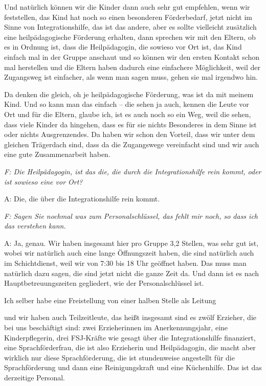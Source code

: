 \begin{linenumbers*}
Und natürlich können wir die Kinder dann auch sehr gut empfehlen, wenn wir feststellen, das Kind hat noch so einen besonderen Förderbedarf, jetzt nicht im Sinne von Integrationshilfe, das ist das andere, aber es sollte vielleicht zusätzlich eine heilpädagogische Förderung erhalten, dann sprechen wir mit den Eltern, ob es in Ordnung ist, dass die Heilpädagogin, die sowieso vor Ort ist, das Kind einfach mal in der Gruppe anschaut und so können wir den ersten Kontakt schon mal herstellen und die Eltern haben dadurch eine einfachere Möglichkeit, weil der Zugangsweg ist einfacher, als wenn man sagen muss, gehen sie mal irgendwo hin. 

Da denken die gleich, oh je heilpädagogische Förderung, was ist da mit meinem Kind. Und so kann man das einfach -- die sehen ja auch, kennen die Leute vor Ort und für die Eltern, glaube ich, ist es auch noch so ein Weg, weil die sehen, dass viele Kinder da hingehen, dass es für sie nichts Besonderes in dem Sinne ist oder nichts Ausgrenzendes. Da haben wir schon den Vorteil, dass wir unter dem gleichen Trägerdach sind, dass da die Zugangswege vereinfacht sind und wir auch eine gute Zusammenarbeit haben.

\emph{F: Die Heilpädagogin, ist das die, die durch die Integrationshilfe rein kommt, oder ist sowieso eine vor Ort?}

A: Die, die über die Integrationshilfe rein kommt. 

\emph{F: Sagen Sie nochmal was zum Personalschlüssel, das fehlt mir noch, so dass ich das verstehen kann.}

A: Ja, genau. Wir haben insgesamt hier pro Gruppe 3,2 Stellen, was sehr gut ist, wobei wir natürlich auch eine lange Öffnungszeit haben, die sind natürlich auch im Schichtdienst, weil wir von 7:30 bis 18 Uhr geöffnet haben. Das muss man natürlich dazu sagen, die sind jetzt nicht die ganze Zeit da. Und dann ist es nach Hauptbetreuungszeiten gegliedert, wie der Personalschlüssel ist. 

Ich selber habe eine Freistellung von einer halben Stelle als Leitung 

und wir haben auch Teilzeitleute, das heißt insgesamt sind es zwölf Erzieher, die bei uns beschäftigt sind: zwei Erzieherinnen im Anerkennungsjahr, eine Kinderpflegerin, drei FSJ-Kräfte wie gesagt über die Integrationshilfe finanziert, eine Sprachförderfrau, die ist also Erzieherin und Heilpädagogin, die macht aber wirklich nur diese Sprachförderung, die ist stundenweise angestellt für die Sprachförderung und dann eine Reinigungskraft und eine Küchenhilfe. Das ist das derzeitige Personal.


\end{linenumbers*}
